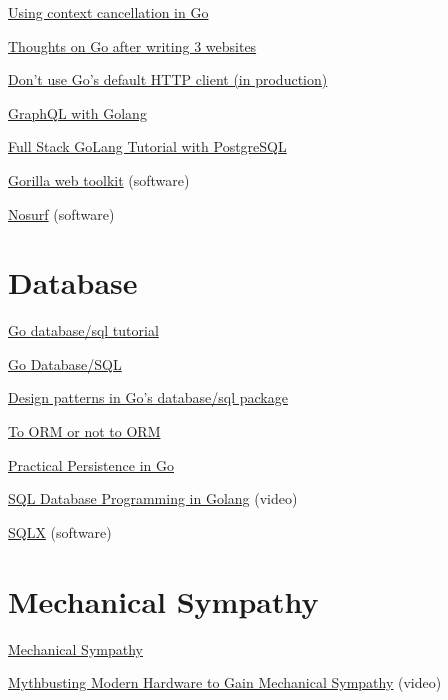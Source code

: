 \documentclass[12pt,notitlepage]{article}
\begin{document}
\href{https://www.sohamkamani.com/blog/golang/2018-06-17-golang-using-context-cancellation/}%
{Using context cancellation in Go}

\href{https://blog.kowalczyk.info/article/uvw2/thoughts-on-go-after-writing-3-websites.html}%
{Thoughts on Go after writing 3 websites }

\href{https://medium.com/@nate510/don-t-use-go-s-default-http-client-4804cb19f779}%
{Don’t use Go’s default HTTP client (in production)}

\href{https://www.freecodecamp.org/news/deep-dive-into-graphql-with-golang-d3e02a429ac3/}{GraphQL with Golang}

\href{https://www.linkedin.com/pulse/full-stack-golang-tutorial-postgresql-andrey-okhotnikov/}%
{Full Stack GoLang Tutorial with PostgreSQL}

\href{http://www.gorillatoolkit.org}{Gorilla web toolkit} (software)

\href{https://github.com/justinas/nosurf}{Nosurf} (software)


\section{Database}

\href{http://go-database-sql.org/}{Go database/sql tutorial}

\href{http://mindbowser.com/golang-go-database-sql/}{Go Database/SQL}

\href{https://eli.thegreenplace.net/2019/design-patterns-in-gos-databasesql-package/}%
{Design patterns in Go's database/sql package}

\href{https://eli.thegreenplace.net/2019/to-orm-or-not-to-orm/}{\color{red} To ORM or not to ORM}

\href{https://www.alexedwards.net/blog/organising-database-access}{Practical Persistence in Go}

\href{https://www.youtube.com/watch?v=Nh3CJYZZSdc}{SQL Database Programming in Golang} (video)

\href{http://jmoiron.github.io/sqlx/}{SQLX} (software)


\section{Mechanical Sympathy}

\href{https://mechanical-sympathy.blogspot.com/}{\color{red} Mechanical Sympathy}

\href{https://www.youtube.com/watch?v=MC1EKLQ2Wmg}{Mythbusting Modern Hardware to Gain Mechanical Sympathy} (video)
\end{document}

